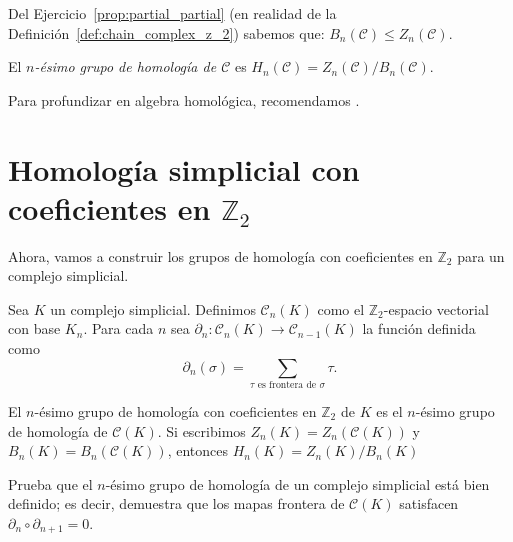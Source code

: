\documentclass{standalone}
\begin{document}
	Del Ejercicio~\ref{prop:partial_partial} (en realidad de la Definición~\ref{def:chain_complex_z_2}) sabemos que: $B_{n}(\mathcal{C})\leq Z_{n}(\mathcal{C})$.
	\begin{definition}\label{defn:z_2_simplicial_homology}
		El \emph{$n$-ésimo grupo de homología de $\mathcal{C}$} es $H_{n}(\mathcal{C})=Z_{n}(\mathcal{C})/B_{n}(\mathcal{C})$.
	\end{definition}
	Para profundizar en algebra homológica, recomendamos \cite{rotman:1988:algebraic:topology}.
	
	\section{Homología simplicial con coeficientes en $\mathbb{Z}_{2}$}
	Ahora, vamos a construir los grupos de homología con coeficientes en $\mathbb{Z}_{2}$ para un complejo simplicial.
	
	Sea $K$ un complejo simplicial. Definimos $\mathcal{C}_{n}(K)$ como el $\mathbb{Z}_{2}$-espacio vectorial con base $K_{n}$. Para cada $n$ sea $\partial_{n}\colon\mathcal{C}_{n}(K)\rightarrow\mathcal{C}_{n-1}(K)$ la función definida como 
	\[
	\partial_{n}(\sigma)=\sum_{\tau\text{ es frontera de }\sigma}\tau.
	\]
	
	\begin{definition}
		El $n$-ésimo grupo de homología con coeficientes en $\mathbb{Z}_{2}$ de $K$ es el $n$-ésimo grupo de homología de $\mathcal{C}(K)$. Si escribimos $Z_{n}(K)=Z_{n}(\mathcal{C}(K))$ y $B_{n}(K)=B_{n}(\mathcal{C}(K))$, entonces $H_{n}(K)=Z_{n}(K)/B_{n}(K)$
	\end{definition}
	
	\begin{exercise}
		Prueba que el $n$-ésimo grupo de homología de un complejo simplicial está bien definido; es decir, demuestra que los mapas frontera de $\mathcal{C}(K)$ satisfacen $\partial_{n}\circ\partial_{n+1}=0$.
	\end{exercise}
	
\end{document}

